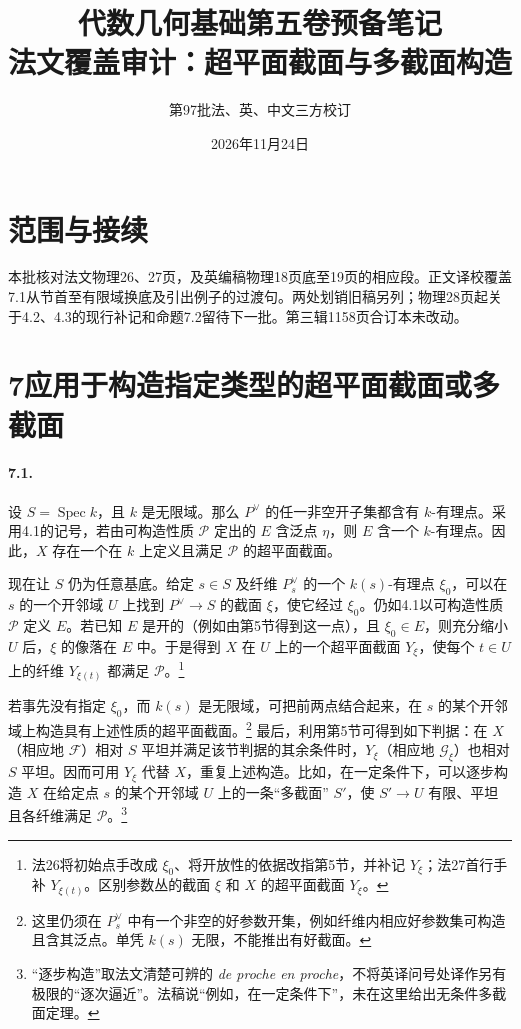 \documentclass[openany,fontset=fandol]{ctexbook}
\DeclareMathOperator{\Spec}{Spec}
\newcommand{\FF}{\mathcal F}
\newcommand{\GG}{\mathcal G}
\newcommand{\calP}{\mathcal P}
\begin{document}
\title{代数几何基础第五卷预备笔记\\法文覆盖审计：超平面截面与多截面构造}
\author{第97批\quad 法、英、中文三方校订}
\date{2026年11月24日}
\maketitle

\section*{范围与接续}
本批核对法文物理26、27页，及英编稿物理18页底至19页的相应段。正文译校覆盖7.1从节首至有限域换底及引出例子的过渡句。两处划销旧稿另列；物理28页起关于4.2、4.3的现行补记和命题7.2留待下一批。第三辑1158页合订本未改动。

\section*{7\quad 应用于构造指定类型的超平面截面或多截面}

\paragraph{7.1.}
设 $S=\Spec k$，且 $k$ 是无限域。那么 $P^\vee$ 的任一非空开子集都含有 $k$-有理点。采用4.1的记号，若由可构造性质 $\calP$ 定出的 $E$ 含泛点 $\eta$，则 $E$ 含一个 $k$-有理点。因此，$X$ 存在一个在 $k$ 上定义且满足 $\calP$ 的超平面截面。

现在让 $S$ 仍为任意基底。给定 $s\in S$ 及纤维 $P^\vee_s$ 的一个 $k(s)$-有理点 $\xi_0$，可以在 $s$ 的一个开邻域 $U$ 上找到 $P^\vee\to S$ 的截面 $\xi$，使它经过 $\xi_0$。仍如4.1以可构造性质 $\calP$ 定义 $E$。若已知 $E$ 是开的（例如由第5节得到这一点），且 $\xi_0\in E$，则充分缩小 $U$ 后，$\xi$ 的像落在 $E$ 中。于是得到 $X$ 在 $U$ 上的一个超平面截面 $Y_\xi$，使每个 $t\in U$ 上的纤维 $Y_{\xi(t)}$ 都满足 $\calP$。\footnote{法26将初始点手改成 $\xi_0$、将开放性的依据改指第5节，并补记 $Y_\xi$；法27首行手补 $Y_{\xi(t)}$。区别参数丛的截面 $\xi$ 和 $X$ 的超平面截面 $Y_\xi$。}

若事先没有指定 $\xi_0$，而 $k(s)$ 是无限域，可把前两点结合起来，在 $s$ 的某个开邻域上构造具有上述性质的超平面截面。\footnote{这里仍须在 $P^\vee_s$ 中有一个非空的好参数开集，例如纤维内相应好参数集可构造且含其泛点。单凭 $k(s)$ 无限，不能推出有好截面。}
最后，利用第5节可得到如下判据：在 $X$（相应地 $\FF$）相对 $S$ 平坦并满足该节判据的其余条件时，$Y_\xi$（相应地 $\GG_\xi$）也相对 $S$ 平坦。因而可用 $Y_\xi$ 代替 $X$，重复上述构造。比如，在一定条件下，可以逐步构造 $X$ 在给定点 $s$ 的某个开邻域 $U$ 上的一条“多截面” $S'$，使 $S'\to U$ 有限、平坦且各纤维满足 $\calP$。\footnote{“逐步构造”取法文清楚可辨的 \emph{de proche en proche}，不将英译问号处译作另有极限的“逐次逼近”。法稿说“例如，在一定条件下”，未在这里给出无条件多截面定理。}
\end{document}
